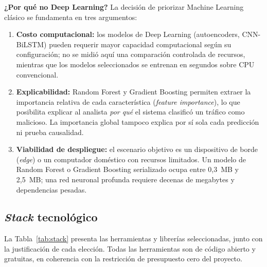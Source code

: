 \documentclass[11pt,a4paper]{article}
\begin{document}
\textbf{¿Por qué no Deep Learning?} La decisión de priorizar Machine Learning clásico se fundamenta en tres argumentos:
\begin{enumerate}
  \item \textbf{Costo computacional:} los modelos de Deep Learning (autoencoders, CNN-BiLSTM) pueden requerir mayor capacidad computacional según su configuración; no se midió aquí una comparación controlada de recursos, mientras que los modelos seleccionados se entrenan en segundos sobre CPU convencional.
  \item \textbf{Explicabilidad:} Random Forest y Gradient Boosting permiten extraer la importancia relativa de cada característica (\textit{feature importance}), lo que posibilita explicar al analista \textit{por qué} el sistema clasificó un tráfico como malicioso. La importancia global tampoco explica por sí sola cada predicción ni prueba causalidad.
  \item \textbf{Viabilidad de despliegue:} el escenario objetivo es un dispositivo de borde (\textit{edge}) o un computador doméstico con recursos limitados. Un modelo de Random Forest o Gradient Boosting serializado ocupa entre 0,3~MB y 2,5~MB; una red neuronal profunda requiere decenas de megabytes y dependencias pesadas.
\end{enumerate}

\subsection{\texorpdfstring{\textit{Stack}}{Stack} tecnológico}
La Tabla~\ref{tab:stack} presenta las herramientas y librerías seleccionadas, junto con la justificación de cada elección. Todas las herramientas son de código abierto y gratuitas, en coherencia con la restricción de presupuesto cero del proyecto.
\end{document}
